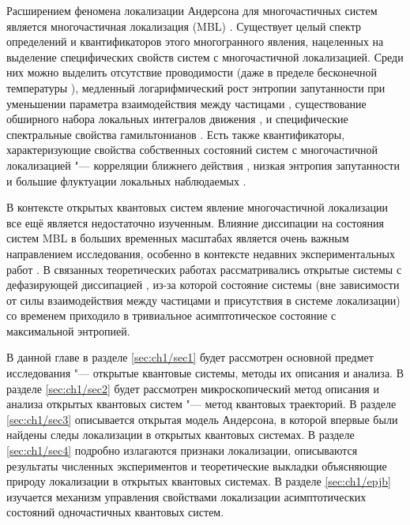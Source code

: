 Расширением феномена локализации Андерсона для многочастичных систем является многочастичная локализация (MBL) \cite{Basko2006, Gornyi2005}.
Существует целый спектр определений и квантификаторов этого многогранного явления, нацеленных на выделение специфических свойств систем с многочастичной локализацией.
Среди них можно выделить отсутствие проводимости \autocite{Gornyi2005} (даже в пределе бесконечной температуры \autocite{Basko2006}), медленный логарифмический рост энтропии запутанности при уменьшении параметра взаимодействия между частицами \autocite{Chiara2006, Znidaric2008, Bardarson2012, Serbyn2013_1}, существование обширного набора локальных интегралов движения \autocite{Serbyn2013_2}, и специфические спектральные свойства гамильтонианов \autocite{Oganesyan2007, Serbyn2016}.
Есть также квантификаторы, характеризующие свойства собственных состояний систем с многочастичной локализацией "--- корреляции ближнего действия \autocite{Pal2010}, низкая энтропия запутанности \autocite{Bauer2013, Kjll2014, Khemani2017} и большие флуктуации локальных наблюдаемых \autocite{Bera2015}.

В контексте открытых квантовых систем явление многочастичной локализации все ещё является недостаточно изученным. Влияние диссипации на состояния систем  MBL в больших временных масштабах является очень важным направлением исследования, особенно в контексте недавних экспериментальных работ \autocite{Schreiber2015, Choi2016, Bordia2017, Smith2016}. В связанных теоретических работах \autocite{Levi2016, Fischer2016, Medvedyeva2016} рассматривались открытые системы с дефазирующей диссипацией \autocite{Poletti2013}, из-за которой состояние системы (вне зависимости от силы взаимодействия между частицами и присутствия в системе локализации) со временем приходило в тривиальное асимптотическое состояние с максимальной энтропией.

В данной главе в разделе \cref{sec:ch1/sec1} будет рассмотрен основной предмет исследования "--- открытые квантовые системы, методы их описания и анализа. 
В разделе \cref{sec:ch1/sec2} будет рассмотрен микроскопический метод описания и анализа открытых квантовых систем "--- метод квантовых траекторий.
В разделе \cref{sec:ch1/sec3} описывается открытая модель Андерсона, в которой впервые были найдены следы локализации в открытых квантовых системах.
В разделе \cref{sec:ch1/sec4} подробно излагаются признаки локализации, описываются результаты численных экспериментов и теоретические выкладки объясняющие природу локализации в открытых квантовых системах. 
В разделе \cref{sec:ch1/epjb} изучается механизм управления свойствами локализации асимптотических состояний одночастичных квантовых систем. 

